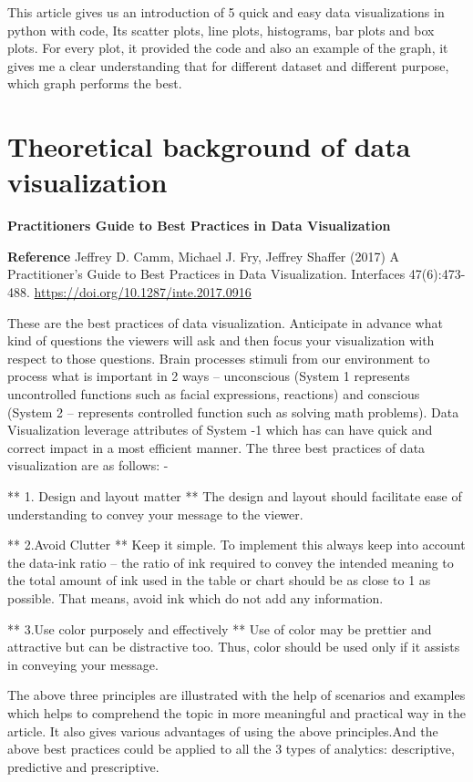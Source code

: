 \documentclass[]{book}
\theoremstyle{definition}
\theoremstyle{definition}
\theoremstyle{definition}
\theoremstyle{remark}
\begin{document}
This article gives us an introduction of 5 quick and easy data
visualizations in python with code, Its scatter plots, line plots,
histograms, bar plots and box plots. For every plot, it provided the
code and also an example of the graph, it gives me a clear understanding
that for different dataset and different purpose, which graph performs
the best.

\section{Theoretical background of data
visualization}\label{theoretical-background-of-data-visualization}

\textbf{Practitioners Guide to Best Practices in Data Visualization}

\textbf{Reference} Jeffrey D. Camm, Michael J. Fry, Jeffrey Shaffer
(2017) A Practitioner's Guide to Best Practices in Data Visualization.
Interfaces 47(6):473-488. \url{https://doi.org/10.1287/inte.2017.0916}

These are the best practices of data visualization. Anticipate in
advance what kind of questions the viewers will ask and then focus your
visualization with respect to those questions. Brain processes stimuli
from our environment to process what is important in 2 ways --
unconscious (System 1 represents uncontrolled functions such as facial
expressions, reactions) and conscious (System 2 -- represents controlled
function such as solving math problems). Data Visualization leverage
attributes of System -1 which has can have quick and correct impact in a
most efficient manner. The three best practices of data visualization
are as follows: -

** 1. Design and layout matter ** The design and layout should
facilitate ease of understanding to convey your message to the viewer.

** 2.Avoid Clutter ** Keep it simple. To implement this always keep into
account the data-ink ratio -- the ratio of ink required to convey the
intended meaning to the total amount of ink used in the table or chart
should be as close to 1 as possible. That means, avoid ink which do not
add any information.

** 3.Use color purposely and effectively ** Use of color may be prettier
and attractive but can be distractive too. Thus, color should be used
only if it assists in conveying your message.

The above three principles are illustrated with the help of scenarios
and examples which helps to comprehend the topic in more meaningful and
practical way in the article. It also gives various advantages of using
the above principles.And the above best practices could be applied to
all the 3 types of analytics: descriptive, predictive and prescriptive.
\end{document}
